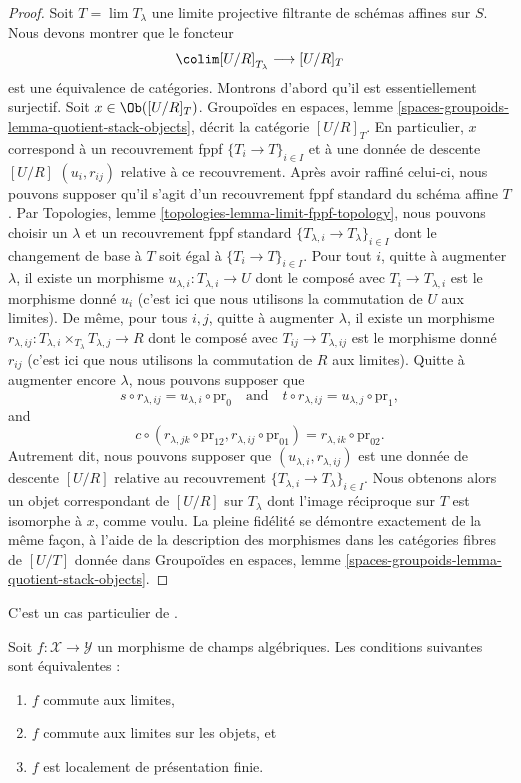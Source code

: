 \begin{proof}
\medskip\noindent
Soit $T = \lim T_\lambda$ une limite projective filtrante de schémas affines
sur $S$. Nous devons montrer que le foncteur
$$
\colim [U/R]_{T_\lambda} \longrightarrow [U/R]_T
$$
est une équivalence de catégories. Montrons d'abord qu'il est essentiellement
surjectif. Soit $x \in \Ob([U/R]_T)$. Groupoïdes en espaces, lemme
\ref{spaces-groupoids-lemma-quotient-stack-objects}, décrit la catégorie
$[U/R]_T$. En particulier, $x$ correspond à un recouvrement fppf
$\{T_i \to T\}_{i \in I}$ et à une donnée de descente $[U/R]$
$(u_i, r_{ij})$ relative à ce recouvrement. Après avoir raffiné celui-ci, nous
pouvons supposer qu'il s'agit d'un recouvrement fppf standard du schéma affine
$T$. Par Topologies, lemme \ref{topologies-lemma-limit-fppf-topology}, nous
pouvons choisir un $\lambda$ et un recouvrement fppf standard
$\{T_{\lambda, i} \to T_\lambda\}_{i \in I}$ dont le changement de base à
$T$ soit égal à $\{T_i \to T\}_{i \in I}$. Pour tout $i$, quitte à augmenter
$\lambda$, il existe un morphisme $u_{\lambda, i} : T_{\lambda, i} \to U$
dont le composé avec $T_i \to T_{\lambda, i}$ est le morphisme donné $u_i$
(c'est ici que nous utilisons la commutation de $U$ aux limites). De même,
pour tous $i, j$, quitte à augmenter $\lambda$, il existe un morphisme
$r_{\lambda, ij} : T_{\lambda, i} \times_{T_\lambda} T_{\lambda, j} \to R$
dont le composé avec $T_{ij} \to T_{\lambda, ij}$ est le morphisme donné
$r_{ij}$ (c'est ici que nous utilisons la commutation de $R$ aux limites).
Quitte à augmenter encore $\lambda$, nous pouvons supposer que
$$
s \circ r_{\lambda, ij} = u_{\lambda, i} \circ \text{pr}_0
\quad\text{and}\quad
t \circ r_{\lambda, ij} = u_{\lambda, j} \circ \text{pr}_1,
$$
and
$$
c \circ (r_{\lambda, jk} \circ \text{pr}_{12}, r_{\lambda, ij}
\circ \text{pr}_{01}) = r_{\lambda, ik} \circ \text{pr}_{02}.
$$
Autrement dit, nous pouvons supposer que
$(u_{\lambda, i}, r_{\lambda, ij})$ est une donnée de descente $[U/R]$
relative au recouvrement
$\{T_{\lambda, i} \to T_\lambda\}_{i \in I}$. Nous obtenons alors un objet
correspondant de $[U/R]$ sur $T_\lambda$ dont l'image réciproque sur $T$ est
isomorphe à $x$, comme voulu. La pleine fidélité se démontre exactement de la
même façon, à l'aide de la description des morphismes dans les catégories
fibres de $[U/T]$ donnée dans Groupoïdes en espaces, lemme
\ref{spaces-groupoids-lemma-quotient-stack-objects}.
\end{proof}

\begin{proposition}
\label{proposition-characterize-locally-finite-presentation}
\begin{reference}
C'est un cas particulier de \cite[Lemma 2.3.15]{Emerton-Gee}.
\end{reference}
Soit $f : \mathcal{X} \to \mathcal{Y}$ un morphisme de champs algébriques.
Les conditions suivantes sont équivalentes :
\begin{enumerate}
\item $f$ commute aux limites,
\item $f$ commute aux limites sur les objets, et
\item $f$ est localement de présentation finie.
\end{enumerate}
\end{proposition}

